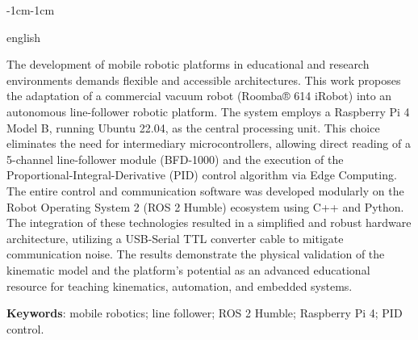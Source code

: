 \begin{adjustwidth}{-1cm}{-1cm}
\begin{resumo}[Abstract]			%
\begin{otherlanguage*}{english}		%

The development of mobile robotic platforms in educational and research environments demands flexible and accessible architectures. This work proposes the adaptation of a commercial vacuum robot (Roomba® 614 iRobot) into an autonomous line-follower robotic platform. The system employs a Raspberry Pi 4 Model B, running Ubuntu 22.04, as the central processing unit. This choice eliminates the need for intermediary microcontrollers, allowing direct reading of a 5-channel line-follower module (BFD-1000) and the execution of the Proportional-Integral-Derivative (PID) control algorithm via Edge Computing. The entire control and communication software was developed modularly on the Robot Operating System 2 (ROS 2 Humble) ecosystem using C++ and Python. The integration of these technologies resulted in a simplified and robust hardware architecture, utilizing a USB-Serial TTL converter cable to mitigate communication noise. The results demonstrate the physical validation of the kinematic model and the platform's potential as an advanced educational resource for teaching kinematics, automation, and embedded systems.

\vspace{\onelineskip}
\noindent
\textbf{Keywords}: mobile robotics; line follower; ROS 2 Humble; Raspberry Pi 4; PID control.
\end{otherlanguage*}
\end{resumo}
\end{adjustwidth}